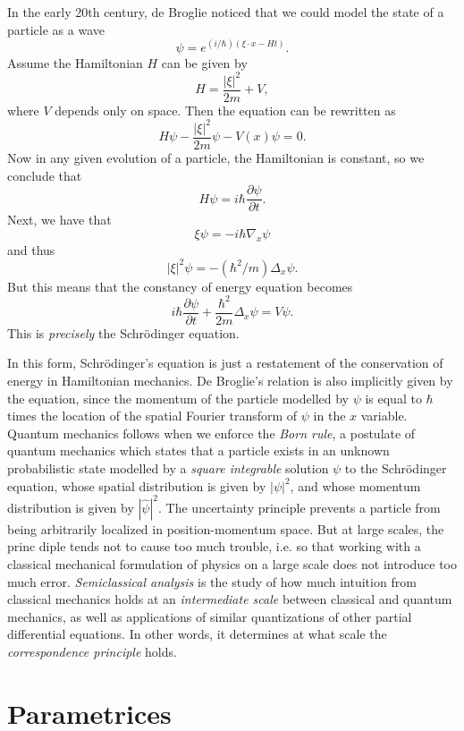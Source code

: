 In the early 20th century, de Broglie noticed that we could model the state of a particle as a wave
%
\[ \psi = e^{(i/\hbar)(\xi \cdot x - H t)}. \]
%
Assume the Hamiltonian $H$ can be given by
%
\[ H = \frac{|\xi|^2}{2m} + V, \]
%
where $V$ depends only on space. Then the equation can be rewritten as
%
\[ H \psi - \frac{|\xi|^2}{2m} \psi - V(x) \psi = 0. \]
%
Now in any given evolution of a particle, the Hamiltonian is constant, so we conclude that
%
\[ H \psi = i \hbar \frac{\partial \psi}{\partial t}. \]
%
Next, we have that
%
\[ \xi \psi = - i \hbar \nabla_x \psi \]
%
and thus
%
\[ |\xi|^2 \psi = - (\hbar^2 / m) \Delta_x \psi. \]
%
But this means that the constancy of energy equation becomes
%
\[ i \hbar \frac{\partial \psi}{\partial t} + \frac{\hbar^2}{2m} \Delta_x \psi = V \psi. \]
%
This is \emph{precisely} the Schr\"{o}dinger equation.

In this form, Schr\"{o}dinger's equation is just a restatement of the conservation of energy in Hamiltonian mechanics. De Broglie's relation is also implicitly given by the equation, since the momentum of the particle modelled by $\psi$ is equal to $\hbar$ times the location of the spatial Fourier transform of $\psi$ in the $x$ variable. Quantum mechanics follows when we enforce the \emph{Born rule}, a postulate of quantum mechanics which states that a particle exists in an unknown probabilistic state modelled by a \emph{square integrable} solution $\psi$ to the Schr\"{o}dinger equation, whose spatial distribution is given by $|\psi|^2$, and whose momentum distribution is given by $|\widehat{\psi}|^2$. The uncertainty principle prevents a particle from being arbitrarily localized in position-momentum space. But at large scales, the princ diple tends not to cause too much trouble, i.e. so that working with a classical mechanical formulation of physics on a large scale does not introduce too much error. \emph{Semiclassical analysis} is the study of how much intuition from classical mechanics holds at an \emph{intermediate scale} between classical and quantum mechanics, as well as applications of similar quantizations of other partial differential equations. In other words, it determines at what scale the \emph{correspondence principle} holds.















\chapter{Parametrices}

